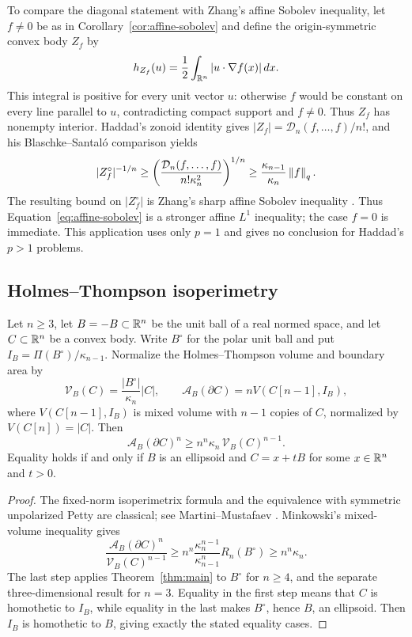 To compare the diagonal statement with Zhang's affine Sobolev
inequality, let $f\ne0$ be as in Corollary~\ref{cor:affine-sobolev}
and define the origin-symmetric convex body $Z_f$ by
\[
 h_{Z_f}(u)=\frac12\int_{\mathbb R^n}|u\cdot\nabla f(x)|\,dx.
\]
This integral is positive for every unit vector $u$: otherwise $f$
would be constant on every line parallel to $u$, contradicting compact
support and $f\ne0$. Thus $Z_f$ has nonempty interior. Haddad's
zonoid identity gives $|Z_f|=\mathcal D_n(f,\ldots,f)/n!$, and his
Blaschke--Santal\'o comparison
\cite[arXiv version, Equations~(24)--(25), p.~17]{Haddad2020} yields
\[
 |Z_f^\circ|^{-1/n}
 \ge \left(\frac{\mathcal D_n(f,\ldots,f)}{n!\kappa_n^2}\right)^{1/n}
 \ge \frac{\kappa_{n-1}}{\kappa_n}\left\lVert f\right\rVert_q.
\]
The resulting bound on $|Z_f^\circ|$ is Zhang's sharp affine Sobolev
inequality \cite{Zhang1999}. Thus Equation~\eqref{eq:affine-sobolev}
is a stronger affine $L^1$ inequality; the case $f=0$ is immediate.
This application uses only $p=1$ and gives no conclusion for
Haddad's $p>1$ problems.

\subsection{Holmes--Thompson isoperimetry}

\begin{corollary}
\label{cor:holmes-thompson}
Let $n\ge3$, let $B=-B\subset\mathbb R^n$ be the unit ball of a real normed
space, and let $C\subset\mathbb R^n$ be a convex body. Write $B^\circ$ for the
polar unit ball and put $I_B=\Pi(B^\circ)/\kappa_{n-1}$. Normalize the
Holmes--Thompson volume and boundary area by
\[
 \mathcal V_B(C)=\frac{|B^\circ|}{\kappa_n}|C|,
 \qquad
 \mathcal A_B(\partial C)=nV(C[n-1],I_B),
\]
where $V(C[n-1],I_B)$ is mixed volume with $n-1$ copies of $C$,
normalized by $V(C[n])=|C|$. Then
\begin{equation}\label{eq:holmes-thompson}
 \mathcal A_B(\partial C)^n
 \ge n^n\kappa_n\,\mathcal V_B(C)^{n-1}.
\end{equation}
Equality holds if and only if $B$ is an ellipsoid and $C=x+tB$ for some
$x\in\mathbb R^n$ and $t>0$.
\end{corollary}

\begin{proof}
The fixed-norm isoperimetrix formula and the equivalence with symmetric
unpolarized Petty are classical; see Martini--Mustafaev
\cite[Definition~1(i), Equation~(2), Section~5, and Theorem~12]{MartiniMustafaev2008}.
Minkowski's mixed-volume inequality gives
\[
 \frac{\mathcal A_B(\partial C)^n}{\mathcal V_B(C)^{n-1}}
 \ge n^n\frac{\kappa_n^{n-1}}{\kappa_{n-1}^{n}}R_n(B^\circ)
 \ge n^n\kappa_n.
\]
The last step applies Theorem~\ref{thm:main} to $B^\circ$ for $n\ge4$,
and the separate three-dimensional result
\cite[Theorem~1.1]{ChenEtAl2026} for $n=3$. Equality in the first step
means that $C$ is homothetic to $I_B$, while equality in the last makes
$B^\circ$, hence $B$, an ellipsoid. Then $I_B$ is homothetic to $B$,
giving exactly the stated equality cases.
\end{proof}
